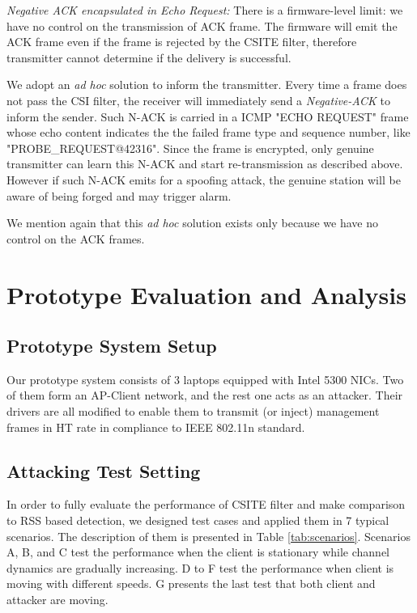 \documentclass[conference]{IEEEtran}
\begin{document}
\textit{Negative ACK encapsulated in Echo Request:} There is a
firmware-level limit: we have no control on the transmission of
ACK frame. The firmware will emit the ACK frame even if the frame is rejected by the CSITE filter,
therefore transmitter cannot determine if the delivery is successful.

We adopt an \textit{ad hoc} solution to inform the transmitter. Every time
a frame does not pass the CSI filter, the receiver will immediately send
a \textit{Negative-ACK} to inform the sender. Such N-ACK is carried in a
ICMP "ECHO REQUEST" frame whose echo content indicates the
the failed frame type and
sequence number, like
"PROBE\_REQUEST@42316". Since the frame is encrypted, only genuine
transmitter can learn this N-ACK and start
re-transmission as described above. However if such N-ACK emits
for a spoofing attack, the genuine station will be aware of being
forged and may trigger alarm.

We mention again that this \textit{ad hoc} solution exists
only because we have no control on the ACK frames.

\section{Prototype Evaluation and Analysis}
\label{sec:evaluation}

\subsection{Prototype System Setup}
Our prototype system consists of 3 laptops equipped with Intel 5300 NICs. Two of them form an AP-Client network, and the rest one acts as an attacker. Their drivers are all modified to enable them to transmit (or inject) management frames in HT rate in compliance to IEEE 802.11n standard.

\subsection{Attacking Test Setting}


In order to fully evaluate the performance of CSITE filter and make comparison to RSS based detection, we designed test cases and applied them in 7 typical scenarios. The description of them is presented in Table \ref{tab:scenarios}. Scenarios A, B, and C test the performance when the client is stationary while channel dynamics are gradually increasing. D to F test the performance when client is moving with different speeds. G presents the last test that both client and attacker are moving.
\end{document}
